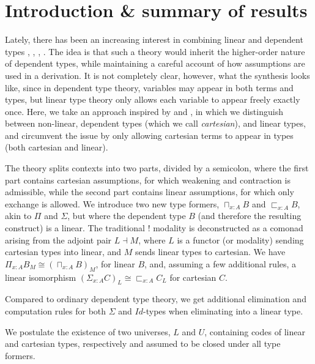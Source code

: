 \documentclass[a4paper,english]{lipics-v2018}
\begin{document}
\section{Introduction \& summary of results}
Lately, there has been an increasing interest in combining linear and dependent types  \cite{schreiber2014quantization}, \cite{krishnaswami}, \cite{vakar14}, \cite{nothing}. The idea is that such a theory would inherit the higher-order nature of dependent types, while maintaining a careful account of how assumptions are used in a derivation. It is not completely clear, however, what the synthesis looks like, since in dependent type theory, variables may appear in both terms and types, but linear type theory only allows each variable to appear freely exactly once. Here, we take an approach inspired by \cite{krishnaswami} and \cite{vakar14}, in which we distinguish between non-linear, dependent types (which we call \textit{cartesian}), and linear types, and circumvent the issue by only allowing cartesian terms to appear in types (both cartesian and linear).

The theory splits contexts into two parts, divided by a semicolon, where the first part contains cartesian assumptions, for which weakening and contraction is admissible, while the second part contains linear assumptions, for which only exchange is allowed. We introduce two new type formers, $\sqcap_{x : A}B$ and $\sqsubset_{x : A}B$, akin to $\Pi$ and $\Sigma$, but where the dependent type $B$ (and therefore the resulting construct) is a linear. The traditional $!$ modality is deconstructed as a comonad arising from the adjoint pair $L \dashv M$, where $L$ is a functor (or modality) sending cartesian types into linear, and $M$ sends linear types to cartesian. We have $\Pi_{x : A}B_M \cong (\sqcap_{x :A}B)_M$, for linear $B$, and, assuming a few additional rules, a linear isomorphism $(\Sigma_{x :A}C)_L \cong \sqsubset_{x :A}C_L$ for cartesian $C$.

Compared to ordinary dependent type theory, we get additional elimination and computation rules for both $\Sigma$ and $Id$-types when eliminating into a linear type.

We postulate the existence of two universes, $L$ and $U$, containing codes of linear and cartesian types, respectively and assumed to be closed under all type formers.
\end{document}
